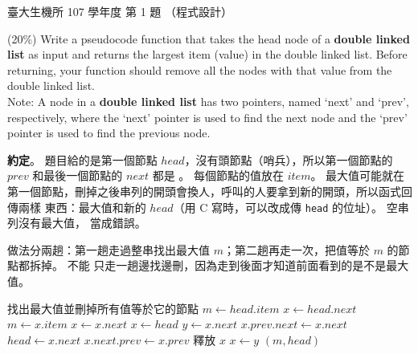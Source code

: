 \begin{pastexam}[label={px:ntu-107-bime-ds-01}]{臺大生機所 107 學年度 第 1 題}
（程式設計）

(20\%) Write a pseudocode function that takes the head node of a \textbf{double linked list} as
input and returns the largest item (value) in the double linked list. Before returning, your
function should remove all the nodes with that value from the double linked list.\\
Note: A node in a \textbf{double linked list} has two pointers, named `next' and `prev',
respectively, where the `next' pointer is used to find the next node and the `prev' pointer is
used to find the previous node.
\end{pastexam}

\begin{pastsoln}
\textbf{約定}。 題目給的是第一個節點 $\mathit{head}$，沒有頭節點（哨兵），所以第一個節點的
$\mathit{prev}$ 和最後一個節點的 $\mathit{next}$ 都是 \NIL。 每個節點的值放在 $\mathit{item}$。
最大值可能就在第一個節點，刪掉之後串列的開頭會換人，呼叫的人要拿到新的開頭，所以函式回傳兩樣
東西：最大值和新的 $\mathit{head}$（用 C 寫時，可以改成傳 \texttt{head} 的位址）。 空串列沒有最大值，
當成錯誤。

做法分兩趟：第一趟走過整串找出最大值 $m$；第二趟再走一次，把值等於 $m$ 的節點都拆掉。 不能
只走一趟邊找邊刪，因為走到後面才知道前面看到的是不是最大值。

\begin{pseudo}{找出最大值並刪掉所有值等於它的節點}
        \State {}
    \EndIf
    \State $m \gets \mathit{head}.\mathit{item}$ 
    \State $x \gets \mathit{head}.\mathit{next}$
            \State $m \gets x.\mathit{item}$
        \EndIf
        \State $x \gets x.\mathit{next}$
    \EndWhile
    \State $x \gets \mathit{head}$ 
        \State $y \gets x.\mathit{next}$ 
                \State $x.\mathit{prev}.\mathit{next} \gets x.\mathit{next}$
            \Else
                \State $\mathit{head} \gets x.\mathit{next}$ 
            \EndIf
                \State $x.\mathit{next}.\mathit{prev} \gets x.\mathit{prev}$
            \EndIf
            \State 釋放 $x$
        \EndIf
        \State $x \gets y$
    \EndWhile
    \State \Return $(m, \mathit{head})$
\EndFunction
\end{pseudo}


\end{pastsoln}

